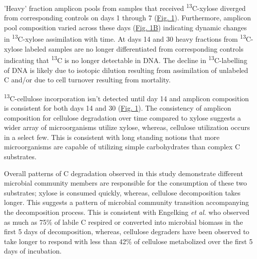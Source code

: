 'Heavy' fraction amplicon pools from samples that received \textsuperscript{13}C-xylose diverged from corresponding controls on days 1 through 7 (\href{https://www.authorea.com/users/3537/articles/3612/master/file/figures/ordination_all1/ordination_all1.png}{Fig. 1}). Furthermore, amplicon pool composition varied across these days (\href{https://www.authorea.com/users/3537/articles/3612/master/file/figures/ordination_all1/ordination_all1.png}{Fig. 1B}) indicating dynamic changes in \textsuperscript{13}C-xylose assimilation with time. At days 14 and 30 heavy fractions from \textsuperscript{13}C-xylose labeled samples are no longer differentiated from corresponding controls indicating that \textsuperscript{13}C is no longer detectable in DNA. The decline in \textsuperscript{13}C-labelling of DNA is likely due to isotopic dilution resulting from assimilation of unlabeled C and/or due to cell turnover resulting from mortality. 

\textsuperscript{13}C-cellulose incorporation isn't detected until day 14 and amplicon composition is consistent for both days 14 and 30 (\href{https://www.authorea.com/users/3537/articles/3612/master/file/figures/ordination_all1/ordination_all1.png}{Fig. 1}). The consistency of amplicon composition for cellulose degradation over time compared to xylose suggests a wider array of microorganisms utilize xylose, whereas, cellulose utilization occurs in a select few. This is consistent with long standing notions that more microorganisms are capable of utilizing simple carbohydrates than complex C substrates. 

Overall patterns of C degradation observed in this study demonstrate different microbial community members are responsible for the consumption of these two substrates; xylose is consumed quickly, whereas, cellulose decomposition takes longer. This suggests a pattern of microbial community transition accompanying the decomposition process. This is consistent with Engelking \textit{et al.}\cite{Engelking_2007} who observed as much as 75\% of labile C respired or converted into microbial biomass in the first 5 days of decomposition, whereas, cellulose degraders have been observed \cite{Hu_1997} to take longer to respond with less than 42\% of cellulose metabolized over the first 5 days of incubation. 

